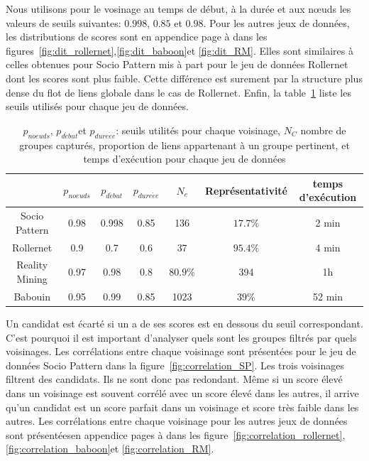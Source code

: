
Nous utilisons pour le vosinage au temps de début, à la durée et aux n\oe uds les valeurs de seuils suivantes: $0.998$, $0.85$ et $0.98$.
Pour les autres jeux de données, les distributions de scores sont en appendice page \pageref{fig:dit_rollernet} à \pageref{fig:dit_RM} dans les figures~\ref{fig:dit_rollernet},\ref{fig:dit_baboon}et \ref{fig:dit_RM}.
Elles sont similaires à celles obtenues pour Socio Pattern mis à part pour le jeu de données Rollernet dont les scores sont plus faible.
Cette différence est surement par la structure plus dense du flot de liens globale dans le cas de Rollernet.
Enfin, la table~\ref{tab:thresholds} liste les seuils utilisés pour chaque jeu de données.
\begin{table}
\centering
\begin{tabular}{|c|c|c|c|c|c|c|}
\hline \rule[-1ex]{0pt}{3.5ex}
 & $p_{noeuds}$ & $p_{d\acute{e}but}$  & $p_{dure\acute{e}e}$ & $N_c$ & Représentativité  & temps d'exécution \\
\hline
Socio Pattern & 0.98 & 0.998 & 0.85 & 136 & $17.7\%$ & 2 min \\
Rollernet& 0.9 & 0.7 & 0.6 & 37 & $95.4\%$ & 4 min \\
Reality Mining & 0.97  & 0.98 & 0.8 & $80.9\%$ & 394 & 1h \\
Babouin & 0.95  &  0.99  & 0.85 & 1023 & $39\%$ & 52 min\\
\hline
\end{tabular}
\caption{$p_{noeuds}$, $p_{d\acute{e}but}$et  $p_{dure\acute{e}e}$: seuils utilités pour chaque voisinage, $N_C$ nombre de groupes capturés, proportion de liens appartenant à un groupe pertinent, et temps d'exécution pour chaque jeu de données}
\label{tab:thresholds}       %
\end{table}

Un candidat est écarté si un a de ses scores est en dessous du seuil correspondant. 
C'est pourquoi il est important d'analyser quels sont les groupes filtrés par quels voisinages.
Les corrélations entre chaque voisinage sont présentées pour le jeu de données Socio Pattern dans la figure~\ref{fig:correlation_SP}.
Les trois voisinages filtrent des candidats.
Ils ne sont donc pas redondant.
Même si un score élevé dans un voisinage est souvent corrélé avec un score élevé dans les autres, il arrive qu'un candidat est un score parfait dans un voisinage et score très faible dans les autres.
Les corrélations entre chaque voisinage pour les autres jeux de données sont présentéesen appendice pages \pageref{fig:correlation_rollernet} à \pageref{fig:correlation_RM} dans les figure~\ref{fig:correlation_rollernet},\ref{fig:correlation_baboon}et \ref{fig:correlation_RM}.


